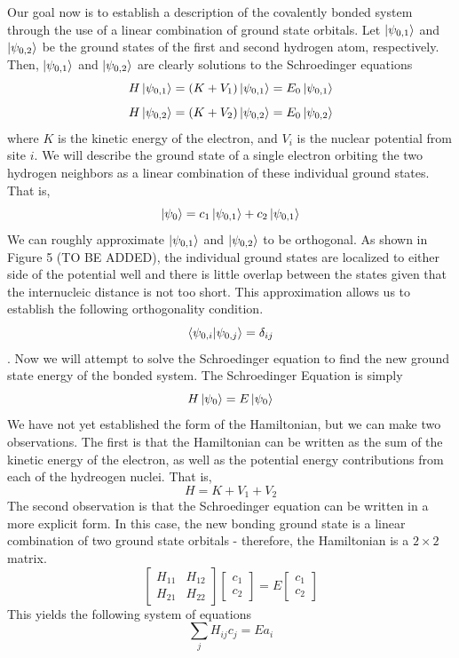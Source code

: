 \documentclass{article}
\begin{document}
Our goal now is to establish a description of the covalently bonded system through the use of a linear combination of ground state orbitals. Let $\ket{\psi_{0,1}}$ and $\ket{\psi_{0,2}}$
be the ground states of the first and second hydrogen atom, respectively. Then, $\ket{\psi_{0,1}}$ and $\ket{\psi_{0,2}}$ are clearly solutions to the Schroedinger equations
$$H\ket{\psi_{0,1}} = (K + V_{1})\ket{\psi_{0,1}} = E_{0}\ket{\psi_{0,1}} $$
$$H\ket{\psi_{0,2}} = (K + V_{2})\ket{\psi_{0,2}} = E_{0}\ket{\psi_{0,2}}$$
where $K$ is the kinetic energy of the electron, and $V_{i}$ is the nuclear potential from site $i$. We will describe the ground state of a single electron orbiting the two hydrogen neighbors as a linear combination of these individual ground states. That is,
$$ \ket{\psi_{0}} = c_{1}\ket{\psi_{0,1}} + c_{2}\ket{\psi_{0,1}}  $$
We can roughly approximate $\ket{\psi_{0,1}}$ and $\ket{\psi_{0,2}}$ to be orthogonal. As shown in Figure 5 (TO BE ADDED), the individual ground states are localized to either side of the potential well and
there is little overlap between the states given that the internucleic distance is not too short. This approximation allows us to establish the following orthogonality condition.
$$ \bra{\psi_{0,i}}\ket{\psi_{0,j}} = \delta_{ij}$$.
Now we will attempt to solve the Schroedinger equation to find the new ground state energy of the bonded system. The Schroedinger Equation is simply
$$H\ket{\psi_{0}} = E\ket{\psi_{0}}$$
We have not yet established the form of the Hamiltonian, but we can make two observations. The first is that the Hamiltonian can be written as the sum of the kinetic energy of the electron, as well as the potential energy contributions from each
of the hydreogen nuclei. That is,
$$ H = K + V_{1} + V_{2}$$
The second observation is that the Schroedinger equation can be written in a more explicit form. In this case, the new bonding ground state is a linear combination of two ground state orbitals - therefore, the
Hamiltonian is a $2\times 2$ matrix.
$$ \begin{bmatrix} H_{11} & H_{12}\\ H_{21}&H_{22} \end{bmatrix}\begin{bmatrix} c_{1} \\ c_{2} \end{bmatrix} = E\begin{bmatrix} c_{1} \\ c_{2} \end{bmatrix}$$
This yields the following system of equations
$$\sum_{j}H_{ij}c_{j} = Ea_{i}$$
\end{document}
